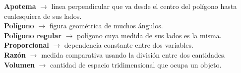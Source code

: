\begin{defcard}\small
    \textbf{Apotema} $\rightarrow$ línea perpendicular que va desde el centro
    del polígono hasta cualesquiera de sus lados.\\
    \textbf{Polígono} $\rightarrow$ figura geométrica de muchos ángulos.\\
    \textbf{Polígono regular} $\rightarrow$ polígono cuya medida de sus lados
    es la misma.\\
    \textbf{Proporcional} $\rightarrow$ dependencia constante entre dos
    variables.\\
    \textbf{Razón} $\rightarrow$ medida comparativa usando la división entre
    dos cantidades.\\
    \textbf{Volumen}	$\rightarrow$ cantidad de espacio tridimensional que
    ocupa un objeto.\\
\end{defcard}